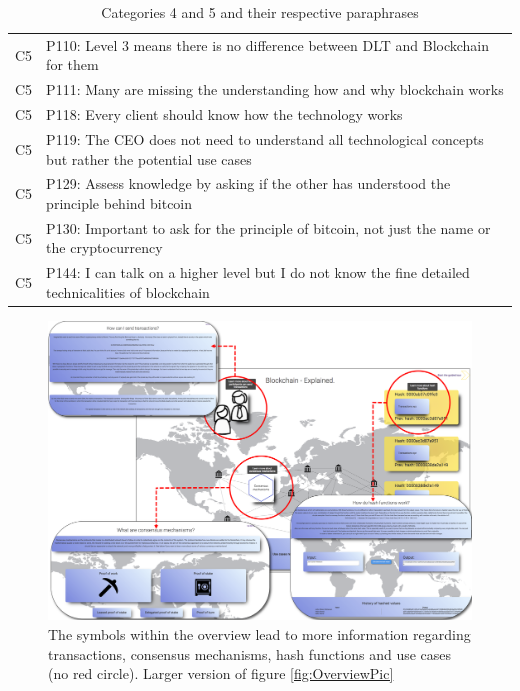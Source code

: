 \begin{table}[H]
\begin{tabularx}{\textwidth}{l|X}
	C5 & P110: Level 3 means there is no difference between DLT and Blockchain for them \\  
	C5 & P111: Many are missing the understanding how and why blockchain works \\  
	C5 & P118: Every client should know how the technology works \\  
	C5 & P119: The CEO does not need to understand all technological concepts but rather the potential use cases \\  
	C5 & P129: Assess knowledge by asking if the other has understood the principle behind bitcoin \\
	C5 & P130: Important to ask for the principle of bitcoin, not just the name or the cryptocurrency \\  
	C5 & P144: I can talk on a higher level but I do not know the fine detailed technicalities of blockchain \\  
    \end{tabularx}
    \caption{Categories 4 and 5 and their respective paraphrases}
\end{table}


\begin{figure}[H]
    \centering
    \includegraphics[height=0.85\textwidth, angle=90]{latex-vorlage_v1.5/graphics/Overview_Big.png}
    \caption{The symbols within the overview lead to more information regarding transactions, consensus mechanisms, hash functions and use cases (no red circle). Larger version of figure \ref{fig:OverviewPic}}
    \label{fig:my_label}
\end{figure}



